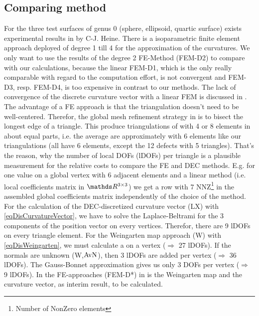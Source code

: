    \subsection{Comparing method}

    For the three test surfaces of genus 0 (sphere, ellipsoid, quartic surface) exists experimental results in \cite{heine} by C-J. Heine. 
    There is a isoparametric finite element approach deployed of degree 1 till 4 for the approximation of the curvatures.
    We only want to use the results of the degree 2 FE-Method (FEM-D2) to compare with our calculations,
    because the linear FEM-D1, which is the only really comparable with regard to the computation effort, is not convergent
    and FEM-D3, resp. FEM-D4, is too expensive in contrast to our methods.
    The lack of convergence of the discrete curvature vector with a linear FEM is discussed in \cite{nochetto}.
    The advantage of a FE approach is that the triangulation doesn't need to be well-centered.
    Therefor, the global mesh refinement strategy in \cite{heine} is to bisect the longest edge of a triangle.
    This produce triangulations of  with 4 or 8 elements in about equal parts,
    i.e. the average are approximately   with 6 elements like our triangulations
    (all  have 6 elements, except the 12 defects with 5 triangles).
    That's the reason, why the number of local DOFs (lDOFs) per triangle is a plausible measurement for the relative costs
    to compare the FE and DEC methods.
    E.g. for one value on a global vertex with 6 adjacent elements and a linear method 
    (i.e. local coefficients matrix in \( \R^{3 \times 3} \)) we get a row with 7 NNZ\footnote{Number of NonZero elements}
    in the assembled global coefficients matrix independently of the choice of the method. 
    For the calculation of the DEC-discretized curvature vector (LX) with \eqref{eqDisCurvatureVector}, 
    we have to solve the Laplace-Beltrami for the 3 components of the position vector on every vertices.
    Therefor, there are 9 lDOFs on every triangle element.
    For the Weingarten map approach (W) with \eqref{eqDisWeingarten}, we must calculate a 
    on a vertex (\( \Rightarrow  \) 27 lDOFs).
    If the normals are unknown (W,\( \text{AvN} \)), then 3 lDOFs are added per vertex (\( \Rightarrow  \) 36 lDOFs). 
    The Gauss-Bonnet approximation gives us only 3 DOFs per vertex (\( \Rightarrow \) 9 lDOFs).
    In the FE-approaches (FEM-D*) in \cite{heine} is the Weingarten map and the curvature vector, as interim result, to be calculated.
